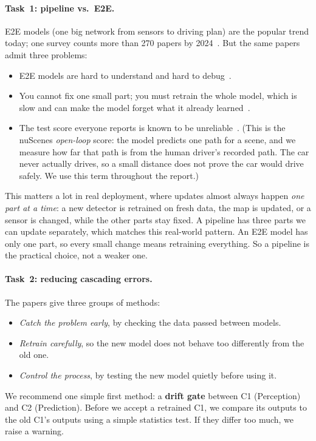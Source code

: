 \documentclass[11pt,a4paper]{article}
\begin{document}
\paragraph{Task~1: pipeline vs.\ E2E.} E2E models (one big network from
sensors to driving plan) are the popular trend today; one survey counts
more than 270 papers by 2024~\cite{chen2024e2esurvey}. But the same
papers admit three problems:
\begin{itemize}[noitemsep]
    \item E2E models are hard to understand and hard to
          debug~\cite{chen2024e2esurvey,hu2025vla}.
    \item You cannot fix one small part; you must retrain the whole
          model, which is slow and can make the model forget what it
          already learned~\cite{ma2025correctad,liu2025r2se}.
    \item The test score everyone reports is known to be
          unreliable~\cite{codevilla2018offline,zhai2023rethinking,dauner2023parting}.
          (This is the nuScenes \emph{open-loop} score: the model predicts
          one path for a scene, and we measure how far that path is from
          the human driver's recorded path. The car never actually drives,
          so a small distance does not prove the car would drive safely.
          We use this term throughout the report.)
\end{itemize}
This matters a lot in real deployment, where updates almost always happen
\emph{one part at a time}: a new detector is retrained on fresh data, the
map is updated, or a sensor is changed, while the other parts stay fixed.
A pipeline has three parts we can update separately, which matches this
real-world pattern. An E2E model has only one part, so every small change
means retraining everything. So a pipeline is the practical choice, not a
weaker one.

\paragraph{Task~2: reducing cascading errors.} The papers give three
groups of methods:
\begin{itemize}[noitemsep]
    \item \emph{Catch the problem early}, by checking the data passed
          between models.
    \item \emph{Retrain carefully}, so the new model does not behave too
          differently from the old one.
    \item \emph{Control the process}, by testing the new model quietly
          before using it.
\end{itemize}
We recommend one simple first method: a \textbf{drift gate} between C1
(Perception) and C2 (Prediction). Before we accept a retrained C1, we
compare its outputs to the old C1's outputs using a simple statistics
test. If they differ too much, we raise a warning.
\end{document}
